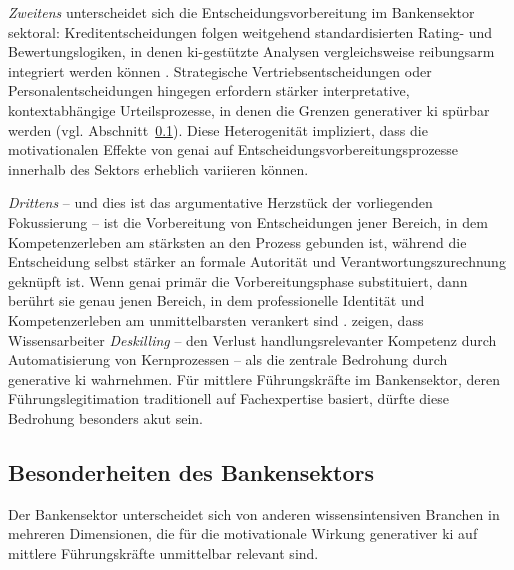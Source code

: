 \textit{Zweitens} unterscheidet sich die Entscheidungsvorbereitung im Bankensektor sektoral: Kreditentscheidungen folgen weitgehend standardisierten Rating- und Bewertungslogiken, in denen \acrshort{ki}-gestützte Analysen vergleichsweise reibungsarm integriert werden können \parencite[vgl.][]{mintzbergStructureUnstructuredDecision1976}. Strategische Vertriebsentscheidungen oder Personalentscheidungen hingegen erfordern stärker interpretative, kontextabhängige Urteilsprozesse, in denen die Grenzen generativer \gls{ki} spürbar werden (vgl. Abschnitt~\ref{subsec:bankensektor}). Diese Heterogenität impliziert, dass die motivationalen Effekte von \gls{genai} auf Entscheidungsvorbereitungsprozesse innerhalb des Sektors erheblich variieren können.

\textit{Drittens} -- und dies ist das argumentative Herzstück der vorliegenden Fokussierung -- ist die Vorbereitung von Entscheidungen jener Bereich, in dem Kompetenzerleben am stärksten an den Prozess gebunden ist, während die Entscheidung selbst stärker an formale Autorität und Verantwortungszurechnung geknüpft ist. Wenn \gls{genai} primär die Vorbereitungsphase substituiert, dann berührt sie genau jenen Bereich, in dem professionelle Identität und Kompetenzerleben am unmittelbarsten verankert sind \parencite[vgl.][]{hermannGenAIPsychologyWork2025, ArtificialIntelligenceFuture, mirbabaieRiseArtificialIntelligence2022}. \textcite{woodruffHowKnowledgeWorkers2024} zeigen, dass Wissensarbeiter \textit{Deskilling} -- den Verlust handlungsrelevanter Kompetenz durch Automatisierung von Kernprozessen -- als die zentrale Bedrohung durch generative \gls{ki} wahrnehmen. Für mittlere Führungskräfte im Bankensektor, deren Führungslegitimation traditionell auf Fachexpertise basiert, dürfte diese Bedrohung besonders akut sein.


\subsection{Besonderheiten des Bankensektors}
\label{subsec:bankensektor}

Der Bankensektor unterscheidet sich von anderen wissensintensiven Branchen in mehreren Dimensionen, die für die motivationale Wirkung generativer \gls{ki} auf mittlere Führungskräfte unmittelbar relevant sind.

